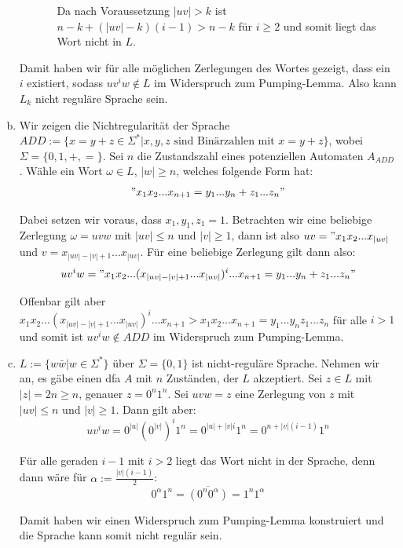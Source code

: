\documentclass{article}
\begin{document}
\begin{enumerate}[a)]
\begin{enumerate}
\begin{enumerate}
			Da nach Voraussetzung $|uv| > k$ ist $n-k + (|uv|-k)(i-1) > n-k$ für $i \ge 2$ und somit liegt das Wort nicht in $L$.
		\end{enumerate}
	\end{enumerate}

	Damit haben wir für alle möglichen Zerlegungen des Wortes gezeigt, dass ein $i$ existiert, sodass $uv^iw \not\in L$ im Widerspruch zum Pumping-Lemma. Also kann $L_k$ nicht reguläre Sprache sein.
	
	\item Wir zeigen die Nichtregularität der Sprache $ADD := \{x = y + z \in \Sigma^* | x,y,z \text{ sind Binärzahlen mit } x = y + z \}$, wobei $\Sigma = \{0,1,+,=\}$. Sei $n$ die Zustandszahl eines potenziellen Automaten $A_{ADD}$. Wähle ein Wort $\omega \in L$, $|w| \ge n$, welches folgende Form hat:
	\begin{equation}
		"x_1x_2...x_{n+1} = y_1 ... y_n + z_1 ... z_n"
	\end{equation}
	
	Dabei setzen wir voraus, dass $x_1, y_1, z_1 = 1$. Betrachten wir eine beliebige Zerlegung $\omega = uvw$ mit $|uv| \le n$ und $|v| \ge 1$, dann ist also $uv = "x_1x_2...x_{|uv|}$ und $v = x_{|uv| - |v| + 1} ... x_{|uv|}$. Für eine beliebige Zerlegung gilt dann also:
	\begin{equation}
		uv^i w = "x_1x_2 ... (x_{|uv| - |v| +1 } ... x_{|uv|})^i ... x_{n+1} = y_1...y_n +  z_1 ... z_n"
	\end{equation}
	
	Offenbar gilt aber $x_1x_2 ... (x_{|uv| - |v| +1 } ... x_{|uv|})^i ... x_{n+1} > x_1x_2... x_{n+1} = y_1...y_n z_1 ... z_n$ für alle $i > 1 $ und somit ist $uv^iw \not \in ADD$ im Widerspruch zum Pumping-Lemma.
	
	\item $L := \{w\bar{w} | w \in \Sigma^* \}$ über $\Sigma = \{0,1\}$ ist nicht-reguläre Sprache. Nehmen wir an, es gäbe einen dfa $A$ mit $n$ Zuständen, der $L$ akzeptiert. Sei $z \in L$ mit $|z| = 2n \ge n$, genauer $z = 0^n 1^n$. Sei $uvw = z$ eine Zerlegung von $z$ mit $|uv| \le n$ und $|v| \ge 1$. Dann gilt aber:
	\begin{equation}
		uv^i w = 0^{|u|} (0^{|v|})^i 1^n = 0^{|u| + |v|i} 1^n = 0^{n + |v|(i-1)} 1^n
	\end{equation}
	
	Für alle geraden $i-1$ mit $i > 2$ liegt das Wort nicht in der Sprache, denn dann wäre für $\alpha := \frac{|v|(i-1)}{2}$:
	\begin{equation}
		0^{\alpha}1^n = \overline{(0^n 0^\alpha)} = 1^n 1^{\alpha}
	\end{equation}
	
	Damit haben wir einen Widerspruch zum Pumping-Lemma konstruiert und die Sprache kann somit nicht regulär sein.
	
\end{enumerate}
\end{document}

